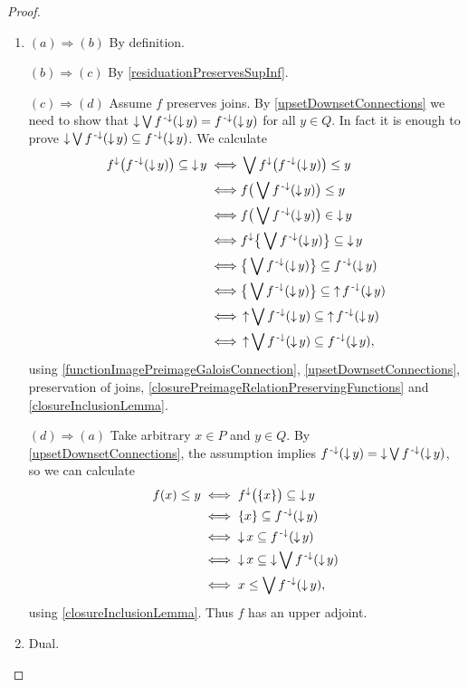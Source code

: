 \begin{proof}
\begin{enumerate}
\item $(a)\Rightarrow (b)$ By definition.

$(b) \Rightarrow (c)$ By \ref{residuationPreservesSupInf}.

$(c) \Rightarrow (d)$ Assume $f$ preserves joins. By \ref{upsetDownsetConnections} we need to show that $\downset \bigvee f^{\preimf}(\downset y) = f^{\preimf}(\downset y)$ for all $y\in Q$. In fact it is enough to prove $\downset \bigvee f^{\preimf}(\downset y) \subseteq f^{\preimf}(\downset y)$. We calculate
\begin{align*}
f^{\imf}\big(f^\preimf(\downset y)\big) \subseteq \downset y  \iff& \bigvee f^{\imf}\big(f^\preimf(\downset y)\big) \leq y \\
\iff& f\big(\bigvee f^\preimf(\downset y)\big) \leq y \\
\iff& f\big(\bigvee f^\preimf(\downset y)\big) \in \downset y \\
\iff& f^\imf\big\{\bigvee f^\preimf(\downset y)\big\} \subseteq \downset y \\
\iff& \big\{\bigvee f^\preimf(\downset y)\big\} \subseteq f^\preimf(\downset y) \\
\iff& \big\{\bigvee f^\preimf(\downset y)\big\} \subseteq \upset f^\preimf(\downset y) \\
\iff& \upset\bigvee f^\preimf(\downset y) \subseteq \upset f^\preimf(\downset y) \\
\iff& \upset\bigvee f^\preimf(\downset y) \subseteq f^\preimf(\downset y),
\end{align*}
using \ref{functionImagePreimageGaloisConnection}, \ref{upsetDownsetConnections}, preservation of joins, \ref{closurePreimageRelationPreservingFunctions} and \ref{closureInclusionLemma}.

$(d) \Rightarrow (a)$ Take arbitrary $x\in P$ and $y\in Q$.
By \ref{upsetDownsetConnections}, the assumption implies $f^{\preimf}(\downset y) = \downset \bigvee f^{\preimf}(\downset y)$, so we can calculate
\begin{align*}
f(x) \leq y &\iff f^\imf\big(\{x\}\big) \subseteq \downset y \\
&\iff \{x\} \subseteq f^\preimf(\downset y) \\
&\iff \downset x \subseteq f^\preimf(\downset y) \\
&\iff \downset x \subseteq \downset \bigvee f^\preimf(\downset y) \\
&\iff x \leq \bigvee f^\preimf(\downset y),
\end{align*}
using \ref{closureInclusionLemma}. Thus $f$ has an upper adjoint.

\item Dual.
\end{enumerate}
\end{proof}

